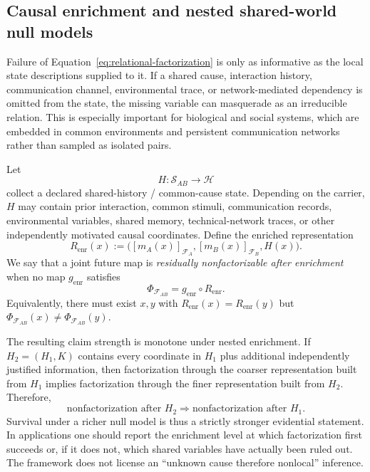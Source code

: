 \documentclass[11pt]{article}
\newcommand{\F}{\mathcal F}
\newcommand{\Sspace}{\mathcal S}
\begin{document}
\subsection{Causal enrichment and nested shared-world null models}
\label{sec:causal-enrichment}

Failure of Equation~\eqref{eq:relational-factorization} is only as informative as the local state descriptions supplied to it. If a shared cause, interaction history, communication channel, environmental trace, or network-mediated dependency is omitted from the state, the missing variable can masquerade as an irreducible relation. This is especially important for biological and social systems, which are embedded in common environments and persistent communication networks rather than sampled as isolated pairs.

Let
\begin{equation}
  H:\Sspace_{AB}\to\mathcal H
  \label{eq:shared-history-map}
\end{equation}
collect a declared shared-history / common-cause state. Depending on the carrier, $H$ may contain prior interaction, common stimuli, communication records, environmental variables, shared memory, technical-network traces, or other independently motivated causal coordinates. Define the enriched representation
\begin{equation}
  R_{\mathrm{enr}}(x)
  :=
  \bigl(
    [m_A(x)]_{\F_A},
    [m_B(x)]_{\F_B},
    H(x)
  \bigr).
  \label{eq:enriched-representation}
\end{equation}
We say that a joint future map is \emph{residually nonfactorizable after enrichment} when no map $g_{\mathrm{enr}}$ satisfies
\begin{equation}
  \Phi_{\F_{AB}}
  =
  g_{\mathrm{enr}}\circ R_{\mathrm{enr}}.
  \label{eq:enriched-nonfactorization}
\end{equation}
Equivalently, there must exist $x,y$ with $R_{\mathrm{enr}}(x)=R_{\mathrm{enr}}(y)$ but $\Phi_{\F_{AB}}(x)\neq\Phi_{\F_{AB}}(y)$.

The resulting claim strength is monotone under nested enrichment. If $H_2=(H_1,K)$ contains every coordinate in $H_1$ plus additional independently justified information, then factorization through the coarser representation built from $H_1$ implies factorization through the finer representation built from $H_2$. Therefore,
\begin{equation}
  \text{nonfactorization after }H_2
  \Longrightarrow
  \text{nonfactorization after }H_1.
  \label{eq:enrichment-monotonicity}
\end{equation}
Survival under a richer null model is thus a strictly stronger evidential statement. In applications one should report the enrichment level at which factorization first succeeds or, if it does not, which shared variables have actually been ruled out. The framework does not license an ``unknown cause therefore nonlocal'' inference.
\end{document}
